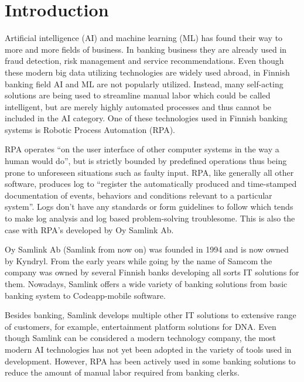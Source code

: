 
\section{Introduction}\label{sec:introduction}

\thispagestyle{empty}
Artificial intelligence (AI) and machine learning (ML)
has found their way to
more and more fields of business.
In banking business they are already used in
fraud detection, risk management and service recommendations.\cite{donepudi2017machine}
Even though these
modern big data utilizing technologies
are widely used abroad,
in Finnish banking field AI and ML are not popularly utilized.
Instead,
many self-acting solutions are being used
to streamline manual labor
which could be called intelligent,
but are merely highly automated processes
and thus cannot be included in the AI category.
One of these technologies used in Finnish banking systems
is Robotic Process Automation (RPA).

RPA operates \enquote{on the user interface of other computer systems
in the way a human would do},\cite{van2018robotic}
but is strictly bounded by predefined operations
thus being prone to unforeseen situations
such as faulty input.
RPA, like generally all other software,
produces log to \enquote{register
the automatically produced and time-stamped documentation
of events, behaviors and conditions
relevant to a particular system}\cite{delarosa2018log}.
Logs don't have any standards or form guidelines to follow
which tends to make
log analysis and log based problem-solving troublesome.
This is also the case with RPA's developed by Oy Samlink Ab.

Oy Samlink Ab (Samlink from now on)
was founded in 1994
and is now owned by Kyndryl.
From the early years
while going by the name of Samcom
the company was owned by several Finnish banks
developing all sorts IT solutions for them.
Nowadays,
Samlink offers a wide variety of banking solutions
from basic banking system to Codeapp-mobile software.

Besides banking,
Samlink develops multiple other IT solutions
to extensive range of customers,
for example,
entertainment platform solutions for DNA\@.
Even though Samlink can be considered
a modern technology company,
the most modern AI technologies has not yet been adopted
in the variety of tools used in development.
However,
RPA has been actively used
in some banking solutions
to reduce the amount of manual labor required
from banking clerks.

